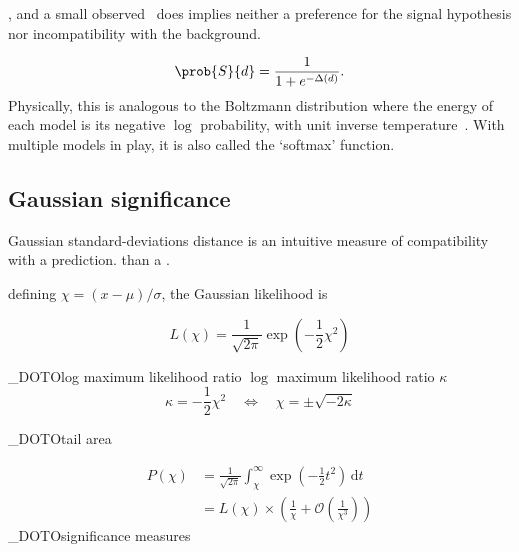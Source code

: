 , and a small observed \pvalue\ does implies neither
a preference for the signal hypothesis nor incompatibility with the background.




\begin{equation}
\label{eqn:searches_logistic}
\prob{S}{d} = \frac{1}{1 + e^{-\Delta(d)}}
.
\end{equation}
Physically, this is analogous to the Boltzmann distribution where the energy
of each model is its negative $\log$ probability, with unit inverse
temperature~\cite{
skilling2017david,
lecun-06,
pmlr-v2-ranzato07a
}.
With multiple models in play, it is also called the `softmax'
function.




\subsection{Gaussian significance}
Gaussian standard-deviations distance is an intuitive measure of compatibility
with a prediction.
than
a \pvalue.

defining $\chi = (x - \mu) / \sigma$, the Gaussian likelihood is

\begin{equation}
L(\chi) =
\frac{1}{\sqrt{2\pi}}
\exp\!\left(-\frac{1}{2}\chi^2\right)
\end{equation}


\NO_DOTO{log maximum likelihood ratio}
$\log$ maximum likelihood ratio $\kappa$
\begin{equation}
\kappa = -\frac{1}{2}\chi^2
\quad
\Leftrightarrow
\quad
\chi = \pm\sqrt{-2\kappa}
\end{equation}

\NO_DOTO{tail area}


\begin{align}
P(\chi)
&=
\frac{1}{\sqrt{2\pi}}
\int_\chi^\infty
\!
\exp\!\left(-\frac{1}{2}t^2\right)
\,\mathrm{d}t
\\[0.5em]
&=
L(\chi)
\times
\left(
\frac{1}{\chi}
+
\mathcal{O}\!\left(\frac{1}{\chi^3}\right)
\right)
\end{align}
\NO_DOTO{significance measures}
~\cite{
jaynes2003probability,
abramowitz1965handbook
}

